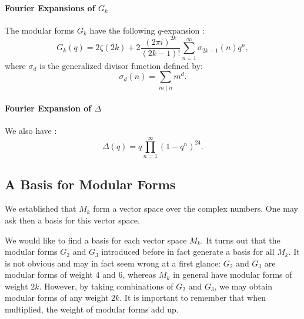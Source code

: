 \paragraph{Fourier Expansions of $G_k$}
The modular forms $G_k$ have the following $q$-expansion \cite[p.92]{CourseInArithmetic}:
$$
G_k(q) = 2\zeta(2k) + 2 \frac{{(2 \pi i)}^{2k}}{(2k-1)!} \sum_{n=1}^{\infty} \sigma_{2k-1}(n)q^n,
$$
where $\sigma_d$ is the generalized divisor function defined by:
$$
\sigma_d(n) = \sum_{m \mid n} m^d.
$$

\paragraph{Fourier Expansion of $\Delta$}
We also have \cite[p.95]{CourseInArithmetic}:
$$
\Delta(q) = q \prod_{n=1}^{\infty} (1-q^n)^{24}.
$$



\subsection{A Basis for Modular Forms}
\label{BasisModularForms}
We established that $M_k$ form a vector space over the complex numbers. 
One may ask then a basis for this vector space.

We would like to find a basis for each vector space $M_k$. It turns out that the modular forms $G_2$ and $G_3$ introduced before in fact generate a basis for all $M_k$. 
It is not obvious and may in fact seem wrong at a first glance: $G_2$ and $G_3$ are modular forms of weight $4$ and $6$, whereas $M_k$ in general have modular forms of weight $2k$.
However, by taking combinations of $G_2$ and $G_3$, we may obtain modular forms of any weight $2k$. It is important to remember that when multiplied, the weight of modular forms add up.

